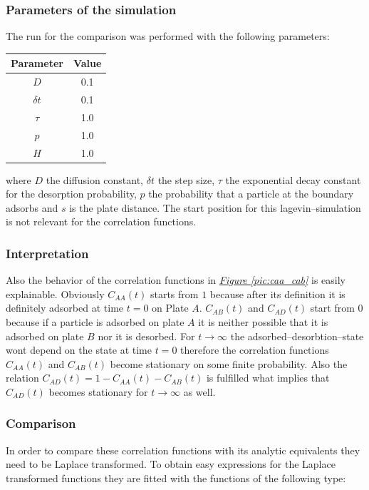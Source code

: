 \documentclass[a4paper, parskip=half]{scrartcl}
\newcommand{\myFigRef}[1]{\textit{\hyperref[#1]{Figure \ref*{#1}}}}
\begin{document}
\subsubsection{Parameters of the simulation}
The run for the comparison was performed with the following parameters:
\begin{center}
\begin{tabular}{c|c}
Parameter & Value \\\hline
$D$ & 0.1 \\
$\delta t$ & 0.1 \\
$\tau$ & 1.0 \\
$p$ & 1.0 \\
$H$ & 1.0
\end{tabular}
\end{center}

where $D$ the diffusion constant, $\delta t$ the step size, $\tau$ the exponential decay constant for the desorption probability, $p$ the probability that a particle at the boundary adsorbs and $s$ is the plate distance. The start position for this lagevin--simulation is not relevant for the correlation functions. 

\subsubsection{Interpretation}

Also the behavior of the correlation functions in \myFigRef{pic:caa_cab} is easily explainable. Obviously $C_{AA}(t)$ starts from $1$ because after its definition it is definitely adsorbed at time $t=0$ on Plate $A$. $C_{AB}(t)$ and $C_{AD}(t)$ start from $0$ because if a particle is adsorbed on plate $A$ it is neither possible that it is adsorbed on plate $B$ nor it is desorbed. For $t \rightarrow \infty$ the adsorbed--desorbtion--state wont depend on the state at time $t = 0$ therefore the correlation functions $C_{AA}(t)$ and $C_{AB}(t)$ become stationary on some finite probability. Also the relation $C_{AD}(t) = 1 - C_{AA}(t) - C_{AB}(t)$ is fulfilled what implies that $C_{AD}(t)$ becomes stationary for $t \rightarrow \infty$ as well.

\subsubsection{Comparison}
In order to compare these correlation functions with its analytic equivalents they need to be Laplace transformed. To obtain easy expressions for the Laplace transformed functions they are fitted with the functions of the following type:
\end{document}
